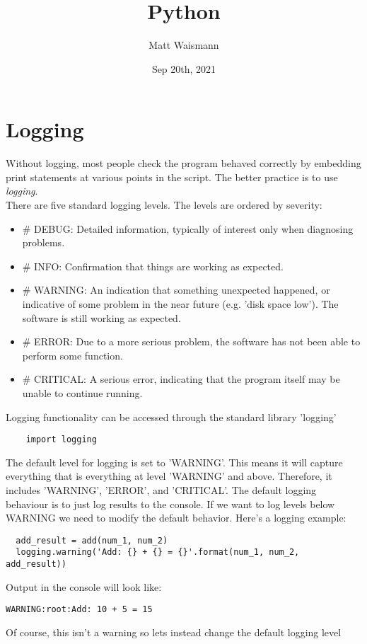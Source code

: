 \documentclass{article}%
\title{Python}
\date{Sep 20th, 2021}
\author{Matt Waismann}
\begin{document}
\maketitle
\section{Logging}
Without logging, most people check the program behaved correctly by embedding print statements at various points in the script. The better practice is to use \textit{logging}. \\

There are five standard logging levels. The levels are ordered by severity:
\begin{itemize}
  \item \# DEBUG: Detailed information, typically of interest only when diagnosing problems.
  \item \# INFO: Confirmation that things are working as expected.
  \item \# WARNING: An indication that something unexpected happened, or indicative of some problem in the near future (e.g. 'disk space low'). The software is still working as expected.
  \item \# ERROR: Due to a more serious problem, the software has not been able to perform some function.
  \item \# CRITICAL: A serious error, indicating that the program itself may be unable to continue running.
\end{itemize}
Logging functionality can be accessed through the standard library 'logging'
\begin{lstlisting}
    import logging
\end{lstlisting}
The default level for logging is set to 'WARNING'. This means it will capture everything that is everything at level 'WARNING' and above. Therefore, it includes 'WARNING', 'ERROR', and 'CRITICAL'. The default logging behaviour is to just log results to the console. If we want to log levels below WARNING we need to modify the default behavior.
Here's a logging example:
\begin{lstlisting}
  add_result = add(num_1, num_2)
  logging.warning('Add: {} + {} = {}'.format(num_1, num_2, add_result))
\end{lstlisting}
Output in the console will look like:
\begin{lstlisting}
WARNING:root:Add: 10 + 5 = 15
\end{lstlisting}
Of course, this isn't a warning so lets instead change the default logging level
\end{document}
